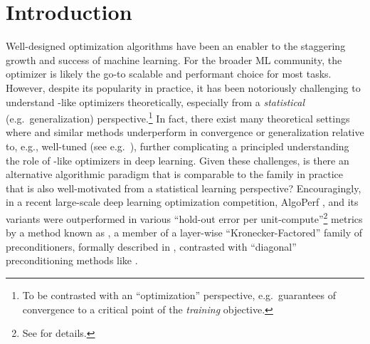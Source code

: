 \vspace{-0.2cm}
\section{Introduction}
\vspace{-0.1cm}

    


Well-designed optimization algorithms have been an enabler to the staggering growth and success of machine learning. For the broader ML community, the \Adam \citep{kingma2014adam} optimizer is likely the go-to scalable and performant choice for most tasks. However, despite its popularity in practice, it has been notoriously challenging to understand \Adam-like optimizers theoretically, especially from a \emph{statistical} (e.g.\ generalization) perspective.\footnote{ To be contrasted with an ``optimization'' perspective, e.g.\ guarantees of convergence to a critical point of  the \emph{training} objective.} In fact, there exist many theoretical settings where \Adam and similar methods underperform in convergence or generalization relative to, e.g., well-tuned \SGD (see e.g.\ \citet{wilson2017marginal, keskar2017improving, reddi2018convergence, gupta2021adam, xie2022adaptive, dereich2024non}), further complicating a principled understanding the role of \Adam-like optimizers in deep learning.
Given these challenges, is there an alternative algorithmic paradigm that is comparable to the \Adam family in practice that is also well-motivated from a statistical learning perspective?
Encouragingly, in a recent large-scale deep learning optimization competition, AlgoPerf \citep{mlcommons2024algoperf}, \Adam and its variants were outperformed in various ``hold-out error per unit-compute''\footnote{See \citet[Section 4.2]{dahl2023benchmarking} for details.} metrics by a method known as \Shampoo \citep{gupta2018shampoo}, a member of a layer-wise ``Kronecker-Factored'' family of preconditioners, formally described in , contrasted with ``diagonal'' preconditioning methods like \Adam. 

